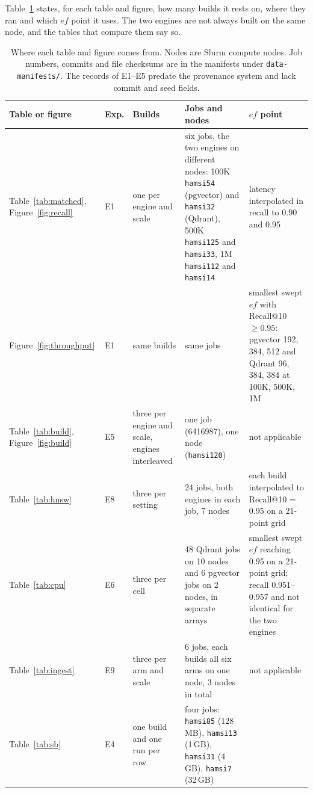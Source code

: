 \documentclass[sigconf, nonacm]{acmart}
\begin{document}
Table~\ref{tab:sources} states, for each table and figure, how many builds it rests on, where
they ran and which $ef$ point it uses. The two engines are not always built on the same node,
and the tables that compare them say so.

\begin{table}[t]
  \caption{Where each table and figure comes from. Nodes are Slurm compute nodes. Job numbers,
  commits and file checksums are in the manifests under \texttt{data-manifests/}. The records of
  E1--E5 predate the provenance system and lack commit and seed fields.}
  \label{tab:sources}
  \small
  \begin{tabular}{p{}p{}p{}p{}p{}}
    \toprule
    Table or figure & Exp. & Builds & Jobs and nodes & $ef$ point \\
    \midrule
    Table~\ref{tab:matched}, Figure~\ref{fig:recall} & E1 & one per engine and scale &
      six jobs, the two engines on different nodes: 100K \texttt{hamsi54} (pgvector) and
      \texttt{hamsi32} (Qdrant), 500K \texttt{hamsi125} and \texttt{hamsi33}, 1M
      \texttt{hamsi112} and \texttt{hamsi14} &
      latency interpolated in recall to 0.90 and 0.95 \\
    Figure~\ref{fig:throughput} & E1 & same builds &
      same jobs &
      smallest swept $ef$ with Recall@10 $\ge 0.95$: pgvector 192, 384, 512 and Qdrant 96,
      384, 384 at 100K, 500K, 1M \\
    Table~\ref{tab:build}, Figure~\ref{fig:build} & E5 & three per engine and scale, engines
      interleaved & one job (6416987), one node (\texttt{hamsi120}) & not applicable \\
    Table~\ref{tab:hnsw} & E8 & three per setting & 24 jobs, both engines in each job, 7 nodes &
      each build interpolated to Recall@10 = 0.95 on a 21-point grid \\
    Table~\ref{tab:cpu} & E6 & three per cell & 48 Qdrant jobs on 10 nodes and 6 pgvector jobs on
      2 nodes, in separate arrays & smallest swept $ef$ reaching 0.95 on a 21-point grid;
      recall 0.951--0.957 and not identical for the two engines \\
    Table~\ref{tab:ingest} & E9 & three per arm and scale & 6 jobs, each builds all six arms on
      one node, 3 nodes in total & not applicable \\
    Table~\ref{tab:sb} & E4 & one build and one run per row & four jobs: \texttt{hamsi85}
      (128\,MB), \texttt{hamsi13} (1\,GB), \texttt{hamsi31} (4\,GB), \texttt{hamsi7} (32\,GB) &

\end{tabular}
\end{table}
\end{document}

